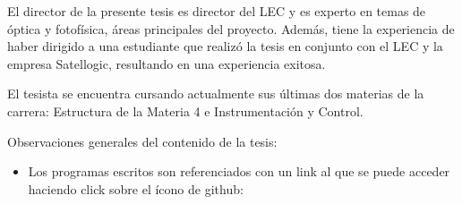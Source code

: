 El director de la presente tesis es director del LEC y es experto en temas de 
óptica y fotofísica, áreas principales del proyecto. Además, tiene la 
experiencia de haber dirigido a una estudiante que realizó la tesis en conjunto 
con el LEC y la empresa Satellogic, resultando en una experiencia exitosa.

El tesista se encuentra cursando actualmente sus últimas dos materias de la 
carrera: 
Estructura de la Materia 4 e Instrumentación y Control.

Observaciones generales del contenido de la tesis:
\begin{itemize}
\item Los programas escritos son referenciados con un link al que se puede acceder haciendo click sobre el ícono de github: \faGithub
\end{itemize}